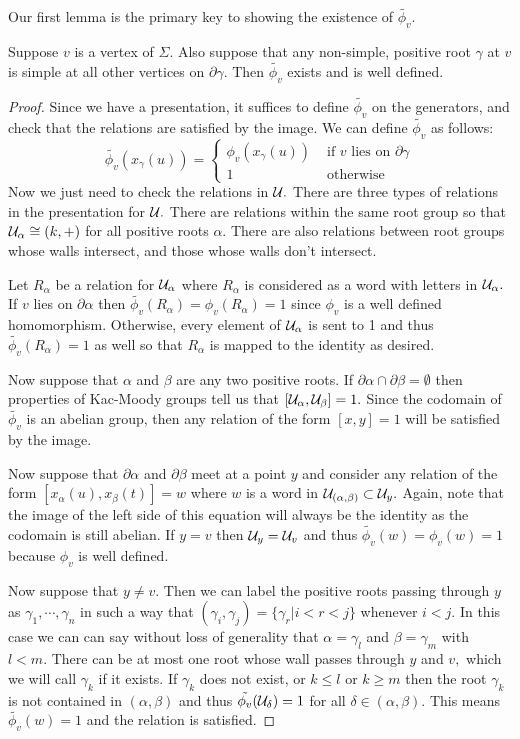 \documentclass[class=book, crop=false,12 pt]{standalone}
\begin{document}
Our first lemma is the primary key to showing the existence of $\tilde{\phi_v}.$
\begin{lemma}
	Suppose $v$ is a vertex of $\Sigma.$ Also suppose that any non-simple, positive root $\gamma$ at $v$ is simple at all other vertices on $\partial \gamma.$ Then $\tilde{\phi_v}$ exists and is well defined.\label{existence}
\end{lemma}
\begin{proof}
	Since we have a presentation, it suffices to define $\tilde{\phi_v}$ on the generators, and check that the relations are satisfied by the image. We can define $\tilde{\phi_v}$ as follows:
\[
	\tilde{\phi_v}(x_\gamma(u))=\begin{cases} \phi_v(x_\gamma(u))&\text{ if }v\text{ lies on }\partial \gamma\\
		1&\text{ otherwise}
	\end{cases}
	\]
	Now we just need to check the relations in $\mathcal{U}.$ There are three types of relations in the presentation for $\mathcal{U}.$ There are relations within the same root group so that $\mathcal{U}_\alpha\cong (k,+)$ for all positive roots $\alpha.$ There are also relations between root groups whose walls intersect, and those whose walls don't intersect.

	Let $R_\alpha$ be a relation for $\mathcal{U}_\alpha$ where $R_\alpha$ is considered as a word with letters in $\mathcal{U}_\alpha.$ If $v$ lies on $\partial \alpha$ then $\tilde{\phi_v}(R_\alpha)=\phi_v(R_\alpha)=1$ since $\phi_v$ is a well defined homomorphism. Otherwise, every element of $\mathcal{U}_\alpha$ is sent to 1 and thus $\tilde{\phi_v}(R_\alpha)=1$ as well so that $R_\alpha$ is mapped to the identity as desired.

	Now suppose that $\alpha$ and $\beta$ are any two positive roots. If $\partial \alpha \cap \partial \beta=\emptyset$ then properties of Kac-Moody groups tell us that $[\mathcal{U}_\alpha,\mathcal{U}_\beta]=1.$ Since the codomain of $\tilde{\phi_v}$ is an abelian group, then any relation of the form $[x,y]=1$ will be satisfied by the image.


	Now suppose that $\partial \alpha$ and $\partial \beta$ meet at a point $y$ and consider any relation of the form $[x_\alpha(u),x_\beta(t)]=w$ where $w$ is a word in $\mathcal{U}_{(\alpha,\beta)}\subset \mathcal{U}_y.$ Again, note that the image of the left side of this equation will always be the identity as the codomain is still abelian. If $y=v$ then $\mathcal{U}_y=\mathcal{U}_v$ and thus $\tilde{\phi_v}(w)=\phi_v(w)=1$ because $\phi_v$ is well defined.

	Now suppose that $y\neq v.$ Then we can label the positive roots passing through $y$ as $\gamma_1,\cdots,\gamma_n$ in such a way that $(\gamma_i,\gamma_j)=\{\gamma_{r}|i<r<j\}$ whenever $i<j.$ In this case we can can say without loss of generality that $\alpha=\gamma_l$ and $\beta=\gamma_m$ with $l<m.$  There can be at most one root whose wall passes through $y$ and $v,$ which we will call $\gamma_k$ if it exists. If $\gamma_k$ does not exist, or $k\le l$ or $k\ge m$ then the root $\gamma_k$ is not contained in $(\alpha,\beta)$ and thus $\tilde{\phi_v}(\mathcal{U}_\delta)=1$ for all $\delta\in (\alpha,\beta).$ This means $\tilde{\phi_v}(w)=1$ and the relation is satisfied.


\end{proof}
\end{document}
